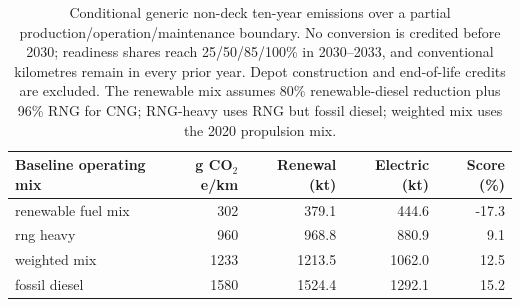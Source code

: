 \begin{table}[htbp]
\centering
\begin{tabular}{@{}lrrrr@{}}
\toprule
Baseline operating mix & g CO$_2$e/km & Renewal (kt) & Electric (kt) & Score (\%)\\
\midrule
renewable fuel mix & 302 & 379.1 & 444.6 & -17.3\\
rng heavy & 960 & 968.8 & 880.9 & 9.1\\
weighted mix & 1233 & 1213.5 & 1062.0 & 12.5\\
fossil diesel & 1580 & 1524.4 & 1292.1 & 15.2\\
\bottomrule
\end{tabular}
\caption{Conditional generic non-deck ten-year emissions over a partial production/operation/maintenance boundary. No conversion is credited before 2030; readiness shares reach 25/50/85/100\% in 2030--2033, and conventional kilometres remain in every prior year. Depot construction and end-of-life credits are excluded. The renewable mix assumes 80\% renewable-diesel reduction plus 96\% RNG for CNG; RNG-heavy uses RNG but fossil diesel; weighted mix uses the 2020 propulsion mix.}
\end{table}

